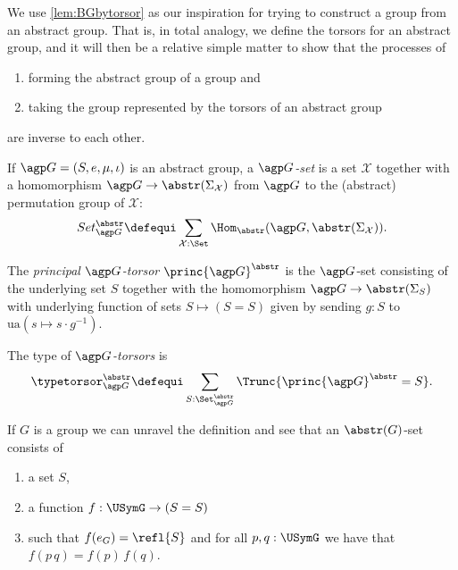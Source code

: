 We use \cref{lem:BGbytorsor} as our inspiration for trying to construct a group from an abstract group.
That is, in total analogy, we define the torsors for an abstract group,
and it will then be a relative simple matter to show that the processes of
\begin{enumerate}
\item forming the abstract group of a group and
\item taking the group represented by the torsors of an abstract group
\end{enumerate}
 are inverse to each other.
\begin{definition}
\label{def:abstrGtorsors}
If ${\agp G}=(S,e,\mu,\iota)$ is an abstract group, a \emph{$\agp G$-set}%
is a set $\mathcal X$ together with a homomorphism
$\agp G\to\abstr(\Sigma_{\mathcal X})$
from $\agp G$ to the (abstract) permutation group of $\mathcal X$:
$$Set_{\agp G}^\abstr\defequi \sum_{\mathcal X:\Set}\Hom_\abstr({\agp G},\abstr(\Sigma_{\mathcal X})).$$

The \emph{principal ${\agp G}$-torsor} $\princ {\agp G}^\abstr$ is the ${\agp G}$-set consisting of the underlying set $S$ together with the homomorphism ${\agp G}\to\abstr(\Sigma_{S})$ with underlying function of sets $S\mapsto (S=S)$ given by sending $g:S$ to $\mathrm{ua}(s\mapsto s\cdot g^{-1})$.

The type of \emph{${\agp G}$-torsors} is
$$\typetorsor_{\agp G}^\abstr\defequi\sum_{S:\Set_{\agp G}^\abstr}\Trunc{\princ {\agp G}^\abstr=S}.$$
\end{definition}
\begin{example}
  If $G$ is a group we can unravel the definition and see that an $\abstr(G)$-set consists of
  \begin{enumerate}
  \item a set $S$,
  \item a function $f:\USymG\to (S=S)$
  \item such that $f(e_G)=\refl{S}$ and for all $p,q:\USymG$ we have that $f(p\, q)=f(p)\,f(q)$.
  \end{enumerate}

\end{example}


